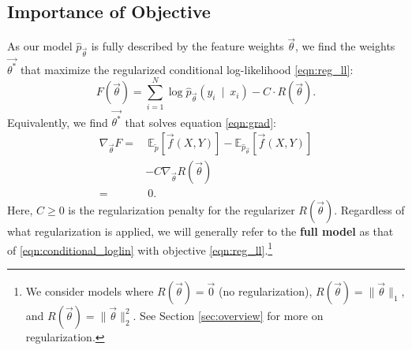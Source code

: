 \documentclass[11pt,letterpaper]{article}
\newcommand{\empirical}[0]{\ensuremath{\tilde{p}}}
\begin{document}
\subsection{Importance of Objective} %
As our model $\hat{p}_{\vec{\theta}}$ is fully described by the feature weights $\vec{\theta}$, we find the weights $\vec{\theta^*}$ that maximize the regularized conditional log-likelihood \eqref{eqn:reg_ll}:
\begin{equation}
F\left(\vec{\theta}\right) = \sum_{i=1}^N \log{\hat{p}_{\vec{\theta}}\left(y_i\ \mid\ x_i\right)} - C \cdot R\left(\vec{\theta}\right).
\label{eqn:reg_ll}
\end{equation}
Equivalently, we find $\vec{\theta^*}$ that solves equation \eqref{eqn:grad}:
\begin{equation}
\begin{aligned}
\nabla_{\vec{\theta}} F
 = &
\ \mathbb{E}_{\empirical{}}\left[\vec{f}(X,Y)\right] 
- \mathbb{E}_{{\hat{p}_{\vec{\theta}}}}\left[\vec{f}(X,Y)\right]\\
 & - C \nabla_{\vec{\theta}}R(\vec{\theta})
\label{eqn:grad} \\
 = &\ 0.
\end{aligned}
\end{equation}
Here, $C \ge 0$ is the regularization penalty for the regularizer $R(\vec{\theta})$. Regardless of what regularization is applied, we will generally refer to the \textbf{full model} as that of \eqref{eqn:conditional_loglin} with objective \eqref{eqn:reg_ll}.\footnote{We consider models where $R(\vec{\theta}) = \vec{0}$ (no regularization), $R(\vec{\theta}) = \|\vec\theta\|_1$, and $R(\vec{\theta}) = \|\vec{\theta}\|_2^2$. See Section \ref{sec:overview} for more on regularization.}
\end{document}
